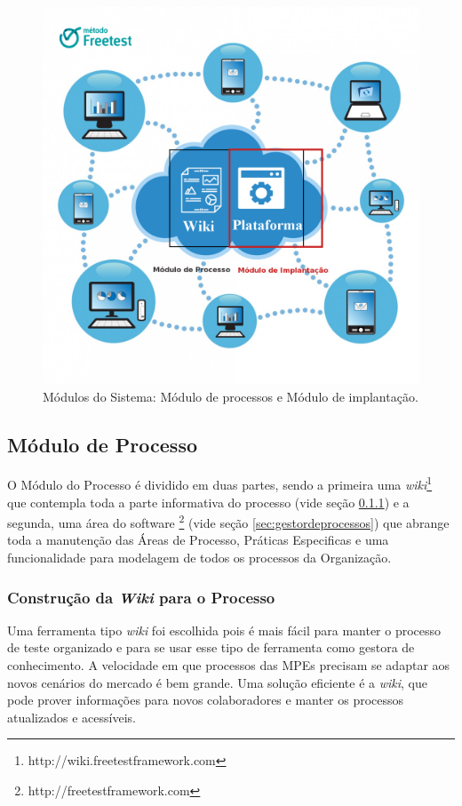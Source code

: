 \begin{figure}[H]
\centering
\includegraphics[width=.75\textwidth]{fig/figura63.png}
\caption{Módulos do Sistema: Módulo de processos e Módulo de implantação.}
\label{fig:fig63}
\end{figure}

\subsection{Módulo de Processo}
\label{sec:ferramentaprocesso}

O Módulo do Processo é dividido em duas partes, sendo a primeira uma \textit{wiki}\footnote{http://wiki.freetestframework.com} que contempla toda a parte informativa do processo (vide seção \ref{sec:wikiprocesso}) e a segunda, uma área do software \footnote{http://freetestframework.com} (vide seção \ref{sec:gestordeprocessos}) que abrange toda a manutenção das Áreas de Processo, Práticas Especificas e uma funcionalidade para modelagem de todos os processos da Organização. 

\subsubsection{Construção da \textit{Wiki} para o Processo}
\label{sec:wikiprocesso}

Uma ferramenta tipo \textit{wiki} foi escolhida pois é mais fácil para manter o processo de teste organizado e para se usar esse tipo de ferramenta como gestora de conhecimento. A velocidade em que processos das MPEs precisam se adaptar aos novos cenários do mercado é bem grande. Uma solução eficiente é a \textit{wiki}, que pode prover informações para novos colaboradores e manter os processos atualizados e acessíveis. 

